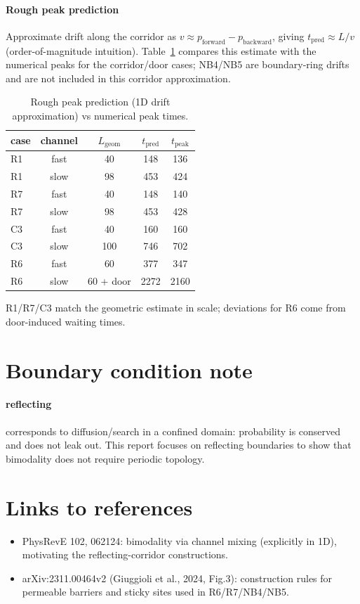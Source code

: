 \documentclass[11pt]{article}
\begin{document}
\paragraph{Rough peak prediction}
Approximate drift along the corridor as $v\approx p_{\text{forward}}-p_{\text{backward}}$, giving $t_{\text{pred}}\approx L/v$ (order-of-magnitude intuition). Table~\ref{tab:peak-predict} compares this estimate with the numerical peaks for the corridor/door cases; NB4/NB5 are boundary-ring drifts and are not included in this corridor approximation.

\begin{table}[!htbp]
  \centering
  \footnotesize
  \begin{tabular}{lcccc}
    \toprule
    case & channel & $L_{\text{geom}}$ & $t_{\text{pred}}$ & $t_{\text{peak}}$ \\
    \midrule
    R1 & fast & 40 & 148 & 136 \\
    R1 & slow & 98 & 453 & 424 \\
    R7 & fast & 40 & 148 & 140 \\
    R7 & slow & 98 & 453 & 428 \\
    C3 & fast & 40 & 160 & 160 \\
    C3 & slow & 100 & 746 & 702 \\
    R6 & fast & 60 & 377 & 347 \\
    R6 & slow & 60 + door & 2272 & 2160 \\
    \bottomrule
  \end{tabular}
  \caption{Rough peak prediction (1D drift approximation) vs numerical peak times.}
  \label{tab:peak-predict}
\end{table}

\noindent R1/R7/C3 match the geometric estimate in scale; deviations for R6 come from door-induced waiting times.


\section{Boundary condition note}
\paragraph{reflecting} corresponds to diffusion/search in a confined domain: probability is conserved and does not leak out. This report focuses on reflecting boundaries to show that bimodality does not require periodic topology.

\section{Links to references}
\begin{itemize}
  \item PhysRevE 102, 062124: bimodality via channel mixing (explicitly in 1D), motivating the reflecting-corridor constructions.
  \item arXiv:2311.00464v2 (Giuggioli et al., 2024, Fig.3): construction rules for permeable barriers and sticky sites used in R6/R7/NB4/NB5.
\end{itemize}
\end{document}
